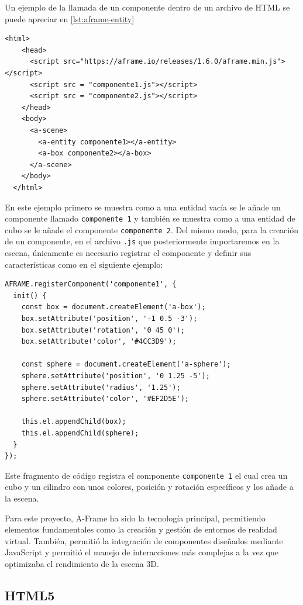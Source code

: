 \documentclass[a4paper, 12pt]{book}
\begin{document}
Un ejemplo de la llamada de un componente dentro de un archivo de HTML se puede apreciar en \ref{lst:aframe-entity}
\begin{lstlisting}[caption=Ejemplo de llamada de entidad, captionpos=b, label=lst:aframe-entity]
  <html>
    <head>
      <script src="https://aframe.io/releases/1.6.0/aframe.min.js"></script>
      <script src = "componente1.js"></script>
      <script src = "componente2.js"></script>
    </head>
    <body>
      <a-scene>
        <a-entity componente1></a-entity>
        <a-box componente2></a-box>
      </a-scene>
    </body>
  </html>
\end{lstlisting}

En este ejemplo primero se muestra como a una entidad vacía se le añade un componente llamado \texttt{componente 1} y también se muestra como a una entidad de cubo se le añade el componente \texttt{componente 2}.
Del mismo modo, para la creación de un componente, en el archivo \texttt{.js} que posteriormente importaremos en la escena, únicamente es necesario registrar el componente y definir sus características como en el siguiente ejemplo:

\begin{lstlisting}[caption=Ejemplo de creacion de entidad, captionpos=b, label=lst:aframe-entity-creation]
  AFRAME.registerComponent('componente1', {
  init() {
    const box = document.createElement('a-box');
    box.setAttribute('position', '-1 0.5 -3');
    box.setAttribute('rotation', '0 45 0');
    box.setAttribute('color', '#4CC3D9');

    const sphere = document.createElement('a-sphere');
    sphere.setAttribute('position', '0 1.25 -5');
    sphere.setAttribute('radius', '1.25');
    sphere.setAttribute('color', '#EF2D5E');

    this.el.appendChild(box);
    this.el.appendChild(sphere);
  }
});
\end{lstlisting}

Este fragmento de código registra el componente \texttt{componente 1} el cual crea un cubo y un cilindro con unos colores, posición y rotación específicos y los añade a la escena.

Para este proyecto, A-Frame ha sido la tecnología principal, permitiendo elementos fundamentales como la creación y gestión de entornos de realidad virtual. 
También, permitió la integración de componentes diseñados mediante JavaScript y permitió el manejo de interacciones más complejas a la vez que optimizaba el rendimiento de la escena 3D.
\subsection{HTML5}
\label{subsec:HTML5}
\end{document}
